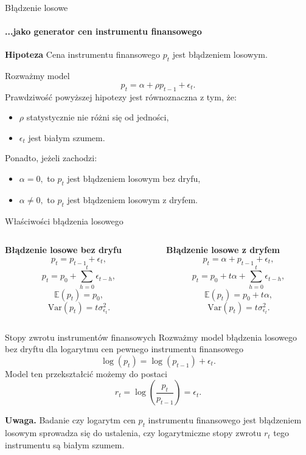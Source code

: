 \documentclass[a4paper, 11pt]{beamer}
\begin{document}
	\begin{frame}{Błądzenie losowe}
		\framesubtitle{...jako generator cen instrumentu finansowego}
		\begin{block}{\textbf{Hipoteza}}
			Cena instrumentu finansowego $p_t$ jest błądzeniem losowym.
		\end{block}
		Rozważmy model \[
			p_t = \alpha + \rho p_{t-1} + \epsilon_t.
		\]
		Prawdziwość powyższej hipotezy jest równoznaczna z tym, że:
		\begin{itemize}
			\item $\rho$ statystycznie nie różni się od jedności,
			\item $\epsilon_t$ jest białym szumem.
		\end{itemize}
		Ponadto, jeżeli zachodzi:
		\begin{itemize}
			\item $\alpha = 0,$ to $p_t$ jest błądzeniem losowym bez dryfu,
			\item $\alpha \neq 0,$ to $p_t$ jest błądzeniem losowym z dryfem.
		\end{itemize}
	\end{frame}
	
	\begin{frame}{Właściwości błądzenia losowego}
		\begin{columns}[onlytextwidth]
			\begin{column}{0.5\textwidth}
				\textbf{Błądzenie losowe bez dryfu} \[
					p_t = p_{t-1} + \epsilon_t,
				\] \[
					p_t = p_0 + \sum_{h=0}^{t} \epsilon_{t-h},
				\] \[
					\mathbb{E}\left(p_t\right) = p_0,
				\] \[
					\mbox{Var}\left(p_t\right) = t \sigma^2_{\epsilon_t}.
				\]
			\end{column}
			\begin{column}{0.5\textwidth}
				\textbf{Błądzenie losowe z dryfem} \[
					p_t = \alpha + p_{t-1} + \epsilon_t,
				\] \[
					p_t = p_0 + t \alpha + \sum_{h=0}^{t} \epsilon_{t-h},
				\] \[
					\mathbb{E}\left(p_t\right) = p_0 + t \alpha,
				\] \[
					\mbox{Var}\left(p_t\right) = t \sigma^2_{\epsilon_t}.
				\]
			\end{column}
		\end{columns}
	\end{frame}
	
	\begin{frame}{Stopy zwrotu instrumentów finansowych}
		Rozważmy model błądzenia losowego bez dryftu dla logarytmu cen pewnego instrumentu finansowego \[
			\log\left(p_t\right) = \log\left(p_{t-1}\right) + \epsilon_t.
		\] Model ten przekształcić możemy do postaci \[
			r_t = \log\left(\frac{p_t}{p_{t-1}}\right) = \epsilon_t.
		\]
		\begin{alert}{\textbf{Uwaga.}}
			Badanie czy logarytm cen $p_t$ instrumentu finansowego jest błądzeniem losowym
			sprowadza się do ustalenia, czy logarytmiczne stopy zwrotu $r_t$ tego instrumentu są białym szumem.
		\end{alert}
	\end{frame}
	
\end{document}
